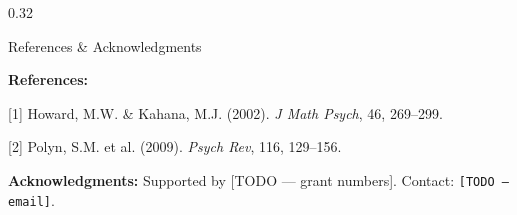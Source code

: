 \begin{frame}[t]{}
\begin{columns}[T]
\begin{column}{0.32\textwidth}
\begin{block}{References \& Acknowledgments}
  {\scriptsize
    \textbf{References:}\par
    {}[1] Howard, M.W. \& Kahana, M.J. (2002). \textit{J Math Psych}, 46, 269--299.\par
    {}[2] Polyn, S.M. et al. (2009). \textit{Psych Rev}, 116, 129--156.\par
    \vspace{0.5em}
    \textbf{Acknowledgments:} Supported by [TODO — grant numbers].
    Contact: \texttt{[TODO — email]}.
  }
\end{block}

\end{column}

\end{columns}

\end{frame}

